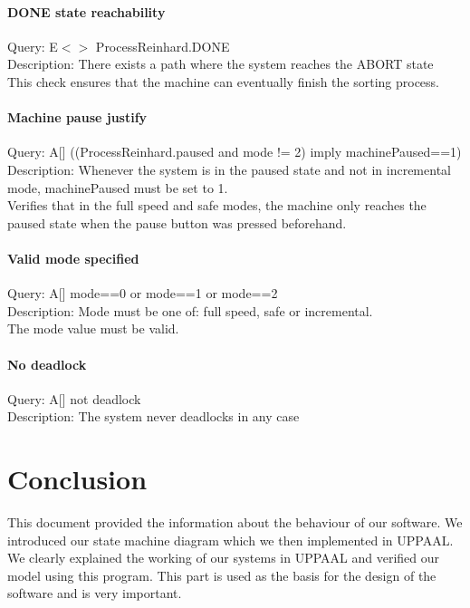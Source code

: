 \documentclass[a4paper,oneside,11pt]{article}
\begin{document}
\paragraph{DONE state reachability}
Query: E$<>$ ProcessReinhard.DONE \\
Description: There exists a path where the system reaches the ABORT state \\
This check ensures that the machine can eventually finish the sorting process.

\paragraph{Machine pause justify}
Query: A[] ((ProcessReinhard.paused and mode != 2) imply machinePaused==1) \\
Description: Whenever the system is in the paused state and not in incremental mode, machinePaused must be set to 1. \\
Verifies that in the full speed and safe modes, the machine only reaches the paused state when the pause button was pressed beforehand.

\paragraph{Valid mode specified}
Query: A[] mode==0 or mode==1 or mode==2 \\
Description: Mode must be one of: full speed, safe or incremental. \\
The mode value must be valid.

\paragraph{No deadlock}
Query: A[] not deadlock \\
Description: The system never deadlocks in any case \\

\section{Conclusion}
This document provided the information about the behaviour of our software. We introduced our state machine diagram which we then implemented in UPPAAL. We clearly explained the working of our systems in UPPAAL and verified our model using this program. This part is used as the basis for the design of the software and is very important.
\end{document}
